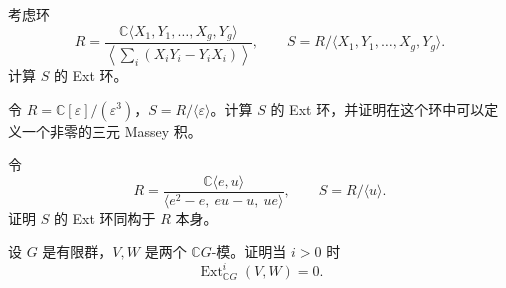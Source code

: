 \begin{exercise}\label{exer:surface-group-ext}
考虑环
\[
  R=\frac{\mathbb C\langle X_1,Y_1,\ldots,X_g,Y_g\rangle}
  {\left\langle\sum_i(X_iY_i-Y_iX_i)\right\rangle},
\qquad
  S=R/\langle X_1,Y_1,\ldots,X_g,Y_g\rangle.
\]
计算 $S$ 的 Ext 环。
\end{exercise}

\begin{exercise}\label{exer:truncated-polynomial-ext}
令 $R=\mathbb C[\varepsilon]/(\varepsilon^3)$，$S=R/\langle\varepsilon\rangle$。计算 $S$ 的 Ext 环，并证明在这个环中可以定义一个非零的三元 Massey 积。
\end{exercise}

\begin{exercise}\label{exer:quiver-like-ext}
令
\[
  R=\frac{\mathbb C\langle e,u\rangle}
  {\langle e^2-e,\ eu-u,\ ue\rangle},
\qquad S=R/\langle u\rangle.
\]
证明 $S$ 的 Ext 环同构于 $R$ 本身。
\end{exercise}

\begin{exercise}\label{exer:finite-group-ext}
设 $G$ 是有限群，$V,W$ 是两个 $\mathbb CG$-模。证明当 $i>0$ 时
\[
  \operatorname{Ext}_{\mathbb CG}^i(V,W)=0.
\]
\end{exercise}

